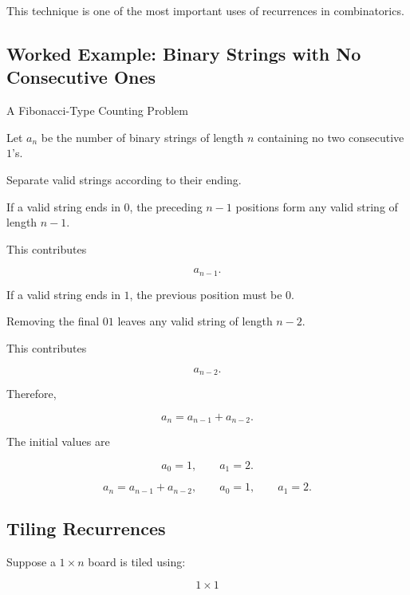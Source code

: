 This technique is one of the most important uses of recurrences in
combinatorics.

\subsection{Worked Example: Binary Strings with No Consecutive Ones}
\label{subsec:binary-no-consecutive-ones}

\begin{workedexamplebox}{A Fibonacci-Type Counting Problem}

Let \(a_n\) be the number of binary strings of length \(n\) containing
no two consecutive \(1\)'s.

Separate valid strings according to their ending.

If a valid string ends in \(0\), the preceding \(n-1\) positions form
any valid string of length \(n-1\).

This contributes

\[
a_{n-1}.
\]

If a valid string ends in \(1\), the previous position must be \(0\).

Removing the final \(01\) leaves any valid string of length \(n-2\).

This contributes

\[
a_{n-2}.
\]

Therefore,

\[
a_n=a_{n-1}+a_{n-2}.
\]

The initial values are

\[
a_0=1,
\qquad
a_1=2.
\]

\begin{answerbox}
\[
\boxed{
a_n=a_{n-1}+a_{n-2},
\qquad
a_0=1,
\qquad
a_1=2.
}
\]
\end{answerbox}

\end{workedexamplebox}

\subsection{Tiling Recurrences}
\label{subsec:tiling-recurrences}

Suppose a \(1\times n\) board is tiled using:

\[
1\times1
\]

